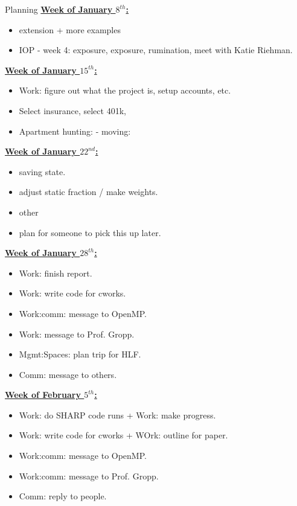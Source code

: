 \documentclass[serif, mathserif, final]{beamer}
\begin{document}
\begin{frame}
\begin{columns}
\begin{column}{0.5\textwidth}
\begin{block}{Planning}
\underline{{\bf Week of January $8^{th}$:}} 
\begin{itemize} 
\small \item \small extension + more examples
\item \small IOP - week 4: exposure, exposure, rumination,   meet with
  Katie Riehman.
\end{itemize} 

\underline{{\bf Week of January $15^{th}$:}}
\begin{itemize} 
\small \item \small Work: figure out what the project is, setup accounts, etc.
\item \small Select insurance, select 401k,
\item \small Apartment hunting: - moving:
\end{itemize}

\underline{{\bf Week of January $22^{nd}$:}} 
\begin{itemize}
\small \item \small saving state.
\item \small adjust static fraction / make weights.
\item \small other
\item \small plan for someone to pick this up later.
\end{itemize}

\underline{{\bf Week of January $28^{th}$:}} 
\begin{itemize}
\small \item \small Work: finish report. 
\item \small Work: write code for cworks. 
\item \small Work:comm: message to OpenMP. 
\item \small Work: message to Prof. Gropp. 
\item \small Mgmt:Spaces: plan trip for HLF. 
\item \small Comm: message to others. 
\end{itemize}

\underline{{\bf Week of February $5^{th}$:}} 
\begin{itemize}
\small \item \small Work: do SHARP code runs + Work: make progress. 
\item \small Work: write code for cworks + WOrk: outline for paper.
\item \small Work:comm: message to OpenMP.
\item \small Work:comm: message to Prof. Gropp.
\item \small Comm: reply to people. 
\end{itemize}


\end{block}
\end{column}
\end{columns}
\end{frame}
\end{document}
